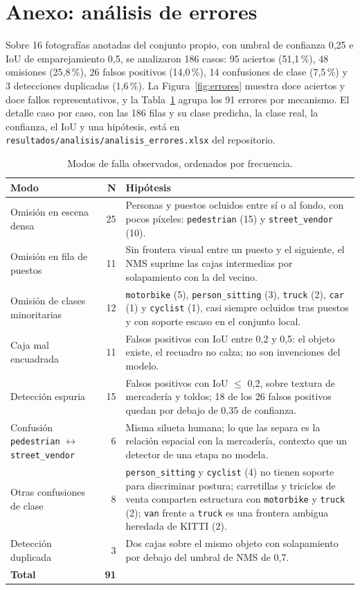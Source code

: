 \documentclass[10pt,a4paper]{article}
\begin{document}
\section{Anexo: análisis de errores}
\label{anexo:errores}
Sobre 16 fotografías anotadas del conjunto propio, con umbral de confianza 0{,}25 e IoU de
emparejamiento 0{,}5, se analizaron 186 casos: 95 aciertos (51{,}1\,\%), 48 omisiones
(25{,}8\,\%), 26 falsos positivos (14{,}0\,\%), 14 confusiones de clase (7{,}5\,\%) y 3
detecciones duplicadas (1{,}6\,\%). La Figura~\ref{fig:errores} muestra doce aciertos y
doce fallos representativos, y la Tabla~\ref{tab:modos} agrupa los 91 errores por
mecanismo. El detalle caso por caso, con las 186 filas y su clase predicha, la clase real,
la confianza, el IoU y una hipótesis, está en
\texttt{resultados/analisis/analisis\_errores.xlsx} del repositorio.
\begin{table}[H]
\centering\scriptsize
\caption{Modos de falla observados, ordenados por frecuencia.}
\label{tab:modos}
\begin{tabular}{@{}p{3.9cm}r p{11.4cm}@{}}
\toprule
\textbf{Modo} & \textbf{N} & \textbf{Hipótesis}\\
\midrule
Omisión en escena densa & 25 & Personas y puestos ocluidos entre sí o al fondo, con pocos píxeles: \texttt{pedestrian} (15) y \texttt{street\_vendor} (10).\\
Omisión en fila de puestos & 11 & Sin frontera visual entre un puesto y el siguiente, el NMS suprime las cajas intermedias por solapamiento con la del vecino.\\
Omisión de clases minoritarias & 12 & \texttt{motorbike} (5), \texttt{person\_sitting} (3), \texttt{truck} (2), \texttt{car} (1) y \texttt{cyclist} (1), casi siempre ocluidos tras puestos y con soporte escaso en el conjunto local.\\
Caja mal encuadrada & 11 & Falsos positivos con IoU entre 0{,}2 y 0{,}5: el objeto existe, el recuadro no calza; no son invenciones del modelo.\\
Detección espuria & 15 & Falsos positivos con IoU $\leq$ 0{,}2, sobre textura de mercadería y toldos; 18 de los 26 falsos positivos quedan por debajo de 0{,}35 de confianza.\\
Confusión \texttt{pedestrian} $\leftrightarrow$ \texttt{street\_vendor} & 6 & Misma silueta humana; lo que las separa es la relación espacial con la mercadería, contexto que un detector de una etapa no modela.\\
Otras confusiones de clase & 8 & \texttt{person\_sitting} y \texttt{cyclist} (4) no tienen soporte para discriminar postura; carretillas y triciclos de venta comparten estructura con \texttt{motorbike} y \texttt{truck} (2); \texttt{van} frente a \texttt{truck} es una frontera ambigua heredada de KITTI (2).\\
Detección duplicada & 3 & Dos cajas sobre el mismo objeto con solapamiento por debajo del umbral de NMS de 0{,}7.\\
\midrule
\textbf{Total} & \textbf{91} & \\
\bottomrule
\end{tabular}
\end{table}
\end{document}
